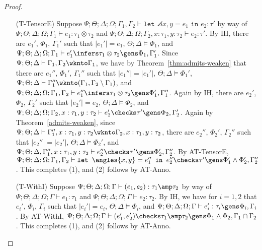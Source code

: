 \begin{proof}
\begin{itemize}
  \item[(T-TensorE)] Suppose $\Psi ; \Theta ; \Delta ; \Omega ; \Gamma_1,\Gamma_2\vdash \texttt{let } \angles{x,y} = e_1 \texttt{ in } e_2 : \tau'$ by way of
  $\Psi ; \Theta ; \Delta ; \Omega ; \Gamma_1\vdash e_1 : \tau_1 \otimes \tau_2$ and
  $\Psi ; \Theta ; \Delta ; \Omega ; \Gamma_2,x : \tau_1, y : \tau_2\vdash e_2 : \tau'$.
  By IH, there are $e_1'$, $\Phi_1$, $\Gamma_1'$ such that
  $|e_1'| = e_1$,
  $\Theta ; \Delta \vDash \Phi_1$, and
  $\Psi ; \Theta ; \Delta ; \Omega ; \Gamma_1 \vdash e_1' \infers \tau_1 \otimes \tau_2 \gens \Phi_1,\Gamma_1'$.
  Since $\Psi ; \Theta ; \Delta \vdash \Gamma_1,\Gamma_2 \wknto \Gamma_1$,
  we have by Theorem~\ref{thm:admits-weaken} that there are $e_1''$, $\Phi_1'$, $\Gamma_1''$ such that
  $|e_1''| = |e_1'|$,
  $\Theta ; \Delta \vDash \Phi_1'$,
  $\Psi ; \Theta ; \Delta \vdash \Gamma_1'' \wknto (\Gamma_1,\Gamma_2 \setminus \Gamma_1)$, and
  $\Psi ; \Theta ; \Delta ; \Omega ; \Gamma_1,\Gamma_2 \vdash e_1'' \infers \tau_1 \otimes \tau_2 \gens \Phi_1',\Gamma_1''$.
  Again by IH, there are $e_2'$, $\Phi_2$, $\Gamma_2'$ such that
  $|e_2'| = e_2$,
  $\Theta ; \Delta \vDash \Phi_2$, and
  $\Psi ; \Theta ; \Delta ; \Omega ; \Gamma_2,x : \tau_1, y : \tau_2 \vdash e_2' \checks \tau' \gens \Phi_2,\Gamma_2'$.
  Again by Theorem~\ref{admits-weaken}, since
  $\Psi ; \Theta ; \Delta \vdash \Gamma_1'',x : \tau_1, y : \tau_2 \wknto \Gamma_2,x : \tau_1, y : \tau_2$,
  there are $e_2''$, $\Phi_2'$, $\Gamma_2''$ such that
  $|e_2''| = |e_2'|$,
  $\Theta ; \Delta \vDash \Phi_2'$, and
  $\Psi ; \Theta ; \Delta, \Gamma_1'', x : \tau_1, y : \tau_2 \vdash e_2'' \checks \tau' \gens \Phi_2',\Gamma_2''$.
  By AT-TensorE,
  $\Psi ; \Theta ; \Delta ; \Omega;  \Gamma_1,\Gamma_2 \vdash \texttt{let } \angles{x,y} = e_1'' \texttt{ in } e_2'' \checks \tau' \gens \Phi_1' \wedge \Phi_2',\Gamma_2''$.
  This completes (1), and (2) follows by AT-Anno.
  
  \item[(T-WithI)] Suppose
  $\Psi ; \Theta ; \Delta ; \Omega ; \Gamma \vdash (e_1,e_2) : \tau_1 \amp \tau_2$ by way of
  $\Psi ; \Theta ; \Delta ; \Omega ; \Gamma \vdash e_1 : \tau_1$ and
  $\Psi ; \Theta ; \Delta ; \Omega ; \Gamma \vdash e_2 : \tau_2$.
  By IH, we have for $i = 1,2$ that $e_i'$, $\Phi_i$, $\Gamma_i$ such that
  $|e_i'| = e_i$,
  $\Theta ; \Delta \vDash \Phi_i$, and
  $\Psi ; \Theta ; \Delta ; \Omega ; \Gamma \vdash e_i' : \tau_i \gens \Phi_i,\Gamma_i$.
  By AT-WithI,
  $\Psi ; \Theta ; \Delta ; \Omega ; \Gamma \vdash (e_1',e_2') \checks \tau_1 \amp \tau_2 \gens \Phi_1 \wedge \Phi_2,\Gamma_1 \cap \Gamma_2$.
  This completes (1), and (2) follows by AT-Anno.
  

\end{itemize}
\end{proof}
